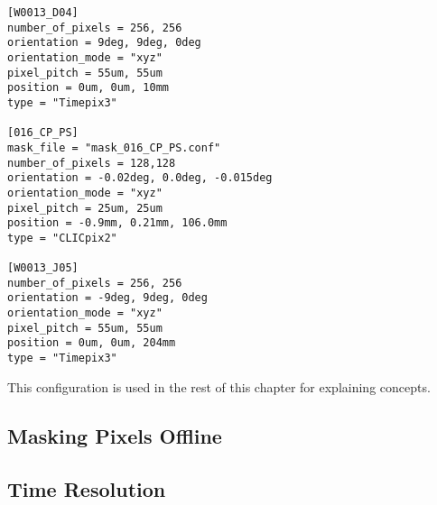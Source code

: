 \begin{verbatim}
[W0013_D04]
number_of_pixels = 256, 256
orientation = 9deg, 9deg, 0deg
orientation_mode = "xyz"
pixel_pitch = 55um, 55um
position = 0um, 0um, 10mm
type = "Timepix3"

[016_CP_PS]
mask_file = "mask_016_CP_PS.conf"
number_of_pixels = 128,128
orientation = -0.02deg, 0.0deg, -0.015deg
orientation_mode = "xyz"
pixel_pitch = 25um, 25um
position = -0.9mm, 0.21mm, 106.0mm
type = "CLICpix2"

[W0013_J05]
number_of_pixels = 256, 256
orientation = -9deg, 9deg, 0deg
orientation_mode = "xyz"
pixel_pitch = 55um, 55um
position = 0um, 0um, 204mm
type = "Timepix3"
\end{verbatim}

This configuration is used in the rest of this chapter for explaining concepts.

\subsection{Masking Pixels Offline}

\subsection{Time Resolution}
